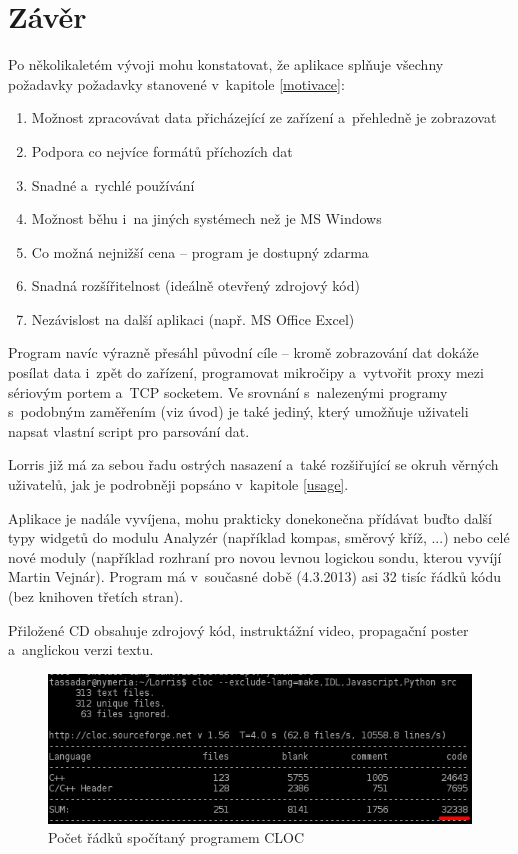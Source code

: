 \documentclass[12pt, a4paper, oneside]{article}
\newcommand{\Has}{\textcolor{green}{\CheckmarkBold}}
\begin{document}
\newpage
\section*{Závěr}
Po několikaletém vývoji mohu konstatovat, že aplikace splňuje všechny požadavky požadavky stanovené v~kapitole \ref{motivace}:
\begin{enumerate}[label=\Has\hspace{1.5mm}\arabic{*}.] 
    \item Možnost zpracovávat data přicházející ze zařízení a~přehledně je zobrazovat%
    \item Podpora co nejvíce formátů příchozích dat%
    \item Snadné a~rychlé používání %
    \item Možnost běhu i~na jiných systémech než je MS Windows %
    \item Co možná nejnižší cena -- program je dostupný zdarma%
    \item Snadná rozšířitelnost (ideálně otevřený zdrojový kód) %
    \item Nezávislost na další aplikaci (např. MS Office Excel) %
\end{enumerate}
Program navíc výrazně přesáhl původní cíle -- kromě zobrazování dat dokáže posílat data i~zpět do zařízení, programovat mikročipy a~vytvořit proxy mezi sériovým portem a~TCP socketem. Ve srovnání s~nalezenými programy s~podobným zaměřením (viz úvod) je také jediný, který umožňuje uživateli napsat vlastní script pro parsování dat.

Lorris již má za sebou řadu ostrých nasazení a~také rozšiřující se okruh věrných uživatelů, jak je podrobněji popsáno v~kapitole \ref{usage}.

Aplikace je nadále vyvíjena, mohu prakticky donekonečna přídávat buďto další typy widgetů do modulu Analyzér (například kompas, směrový kříž, ...) nebo celé nové moduly (například rozhraní pro novou levnou logickou sondu, kterou vyvíjí Martin Vejnár). Program má v~současné době (4.3.2013) asi 32 tisíc řádků kódu (bez knihoven třetích stran).

Přiložené CD obsahuje zdrojový kód, instruktážní video, propagační poster a~anglickou verzi textu.
\begin{figure}[H]
\begin{center}
\includegraphics[width=\textwidth]{img/cloc_edit.png}
\caption{Počet řádků spočítaný programem CLOC\cite{cloc}}
\end{center}
\end{figure}
\end{document}
